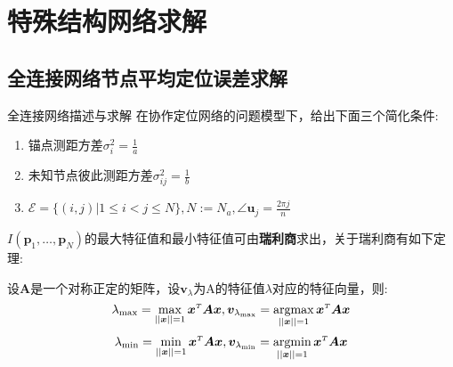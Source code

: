 \chapter{特殊结构网络求解}\label{cha:content4}
\section{全连接网络节点平均定位误差求解}\label{section:complete_graph_cooperation}
{全连接网络描述与求解}
在协作定位网络的问题模型下，给出下面三个简化条件:
\begin{enumerate}
\item 锚点测距方差$\sigma_i^2=\frac{1}{a}$
\item 未知节点彼此测距方差$\sigma^2_{ij}=\frac{1}{b}$
\item $\mathcal{E}=\{(i,j)|1\leq i <j\leq N\},N:=N_a,\angle\bm{u}_j=\frac{2\pi j}{n}$
\end{enumerate}
$I(\bm{p}_1,\dots,\bm{p}_N)$的最大特征值和最小特征值可由\textbf{瑞利商}求出，关于瑞利商有如下定理:
\begin{theorem}\label{theorem:rayleigh}
  设$\bm{A}$是一个对称正定的矩阵，设$\bm{v}_{\lambda}$为A的特征值$\lambda$对应的特征向量，则:
\[
\displaystyle\lambda_{\text{max}}=\max_{||\bm{x}||=1} \bm{x}^{\scriptscriptstyle T}\bm{A}\bm{x},\bm{v}_{\lambda_{\text{max}}}=\operatorname*{argmax}_{||\bm{x}||=1} \bm{x}^{\scriptscriptstyle T}\bm{A}\bm{x}
\]\[
\displaystyle\lambda_{\text{min}}=\min_{||\bm{x}||=1} \bm{x}^{\scriptscriptstyle T}\bm{A}\bm{x},\bm{v}_{\lambda_{\text{min}}}=\operatorname*{argmin}_{||\bm{x}||=1} \bm{x}^{\scriptscriptstyle T}\bm{A}\bm{x}
\]
\end{theorem}


